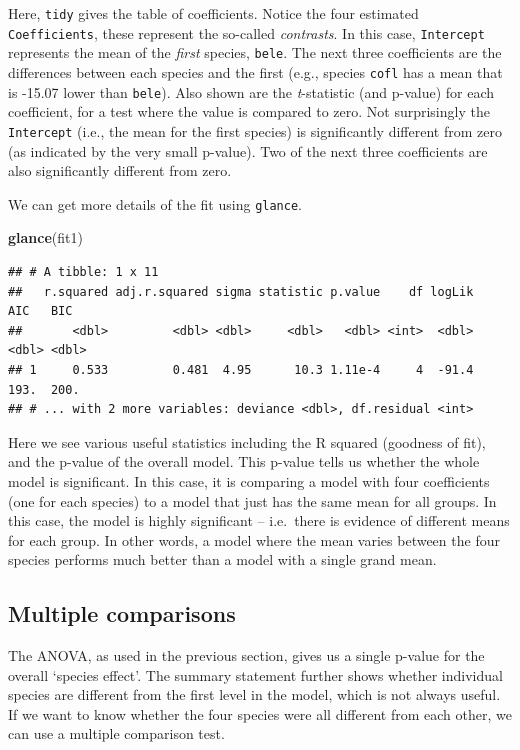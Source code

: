 \documentclass[]{book}
\newenvironment{Shaded}{\begin{snugshade}}{\end{snugshade}}
\newcommand{\KeywordTok}[1]{\textcolor[rgb]{0.13,0.29,0.53}{\textbf{#1}}}
\newcommand{\NormalTok}[1]{#1}
\begin{document}
Here, \texttt{tidy} gives the table of coefficients. Notice the four estimated \texttt{Coefficients}, these represent the so-called \emph{contrasts}. In this case, \texttt{Intercept} represents the mean of the \emph{first} species, \texttt{bele}. The next three coefficients are the differences between each species and the first (e.g., species \texttt{cofl} has a mean that is -15.07 lower than \texttt{bele}). Also shown are the \emph{t}-statistic (and p-value) for each coefficient, for a test where the value is compared to zero. Not surprisingly the \texttt{Intercept} (i.e., the mean for the first species) is significantly different from zero (as indicated by the very small p-value). Two of the next three coefficients are also significantly different from zero.

We can get more details of the fit using \texttt{glance}.

\begin{Shaded}
\begin{Highlighting}[]
\KeywordTok{glance}\NormalTok{(fit1)}
\end{Highlighting}
\end{Shaded}

\begin{verbatim}
## # A tibble: 1 x 11
##   r.squared adj.r.squared sigma statistic p.value    df logLik   AIC   BIC
##       <dbl>         <dbl> <dbl>     <dbl>   <dbl> <int>  <dbl> <dbl> <dbl>
## 1     0.533         0.481  4.95      10.3 1.11e-4     4  -91.4  193.  200.
## # ... with 2 more variables: deviance <dbl>, df.residual <int>
\end{verbatim}

Here we see various useful statistics including the R squared (goodness of fit), and the p-value of the overall model. This p-value tells us whether the whole model is significant. In this case, it is comparing a model with four coefficients (one for each species) to a model that just has the same mean for all groups. In this case, the model is highly significant -- i.e.~there is evidence of different means for each group. In other words, a model where the mean varies between the four species performs much better than a model with a single grand mean.

\hypertarget{multcomp}{%
\subsection{Multiple comparisons}\label{multcomp}}

The ANOVA, as used in the previous section, gives us a single p-value for the overall `species effect'. The summary statement further shows whether individual species are different from the first level in the model, which is not always useful. If we want to know whether the four species were all different from each other, we can use a multiple comparison test.
\end{document}
